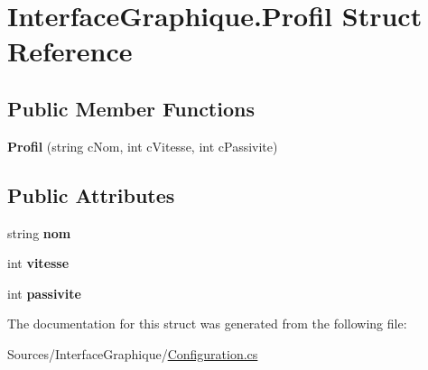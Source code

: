 \hypertarget{struct_interface_graphique_1_1_profil}{}\section{Interface\+Graphique.\+Profil Struct Reference}
\label{struct_interface_graphique_1_1_profil}
\subsection*{Public Member Functions}
\begin{DoxyCompactItemize}
\item 
{\bfseries Profil} (string c\+Nom, int c\+Vitesse, int c\+Passivite)
\end{DoxyCompactItemize}
\subsection*{Public Attributes}
\begin{DoxyCompactItemize}
\item 
string {\bfseries nom}
\item 
int {\bfseries vitesse}
\item 
int {\bfseries passivite}
\end{DoxyCompactItemize}


The documentation for this struct was generated from the following file\+:\begin{DoxyCompactItemize}
\item 
Sources/\+Interface\+Graphique/\hyperlink{_configuration_8cs}{Configuration.\+cs}\end{DoxyCompactItemize}

